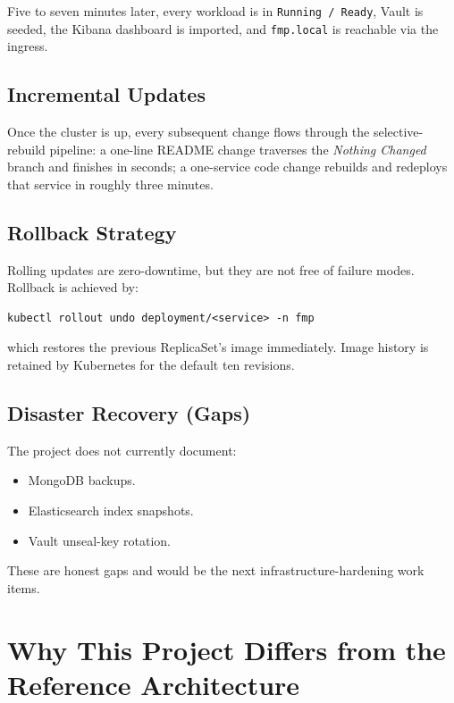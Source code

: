 \documentclass[11pt,a4paper]{article}
\begin{document}
Five to seven minutes later, every workload is in
\texttt{Running / Ready}, Vault is seeded, the Kibana dashboard is
imported, and \texttt{fmp.local} is reachable via the ingress.

\subsection{Incremental Updates}
Once the cluster is up, every subsequent change flows through the
selective-rebuild pipeline: a one-line README change traverses the
\emph{Nothing Changed} branch and finishes in seconds; a one-service
code change rebuilds and redeploys that service in roughly three
minutes.

\subsection{Rollback Strategy}
Rolling updates are zero-downtime, but they are not free of failure
modes.  Rollback is achieved by:

\begin{lstlisting}
kubectl rollout undo deployment/<service> -n fmp
\end{lstlisting}

which restores the previous ReplicaSet's image immediately.  Image
history is retained by Kubernetes for the default ten revisions.

\subsection{Disaster Recovery (Gaps)}
The project does not currently document:

\begin{itemize}[leftmargin=*]
  \item MongoDB backups.
  \item Elasticsearch index snapshots.
  \item Vault unseal-key rotation.
\end{itemize}

These are honest gaps and would be the next infrastructure-hardening
work items.

\section{Why This Project Differs from the Reference Architecture}
\end{document}
